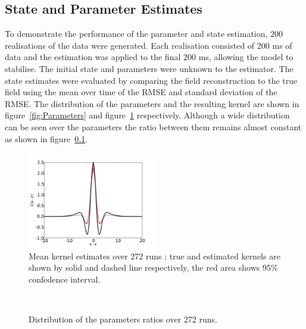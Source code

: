 \documentclass[12pt]{iopart}
\begin{document}
\subsection{State and Parameter Estimates} To demonstrate the performance of the parameter and state estimation, $200$ realisations of the data were generated. Each realisation consisted of 200 ms of data and the estimation was applied to the final 200 ms, allowing the model to stabilise. The initial state and parameters were unknown to the estimator. The state estimates were evaluated by comparing the field reconstruction to the true field using the mean over time of the RMSE and standard deviation of the RMSE. The distribution of the parameters and the resulting kernel are shown in figure~\ref{fig:Parameters} and figure~\ref{fig:KernelEstimates} respectively. Although a wide distribution can be seen over the parameters the ratio between them remains almost constant as shown in figure~\ref{}.
\begin{figure}
\includegraphics[width=0.5\textwidth]{./Graph/KernelEstimate.pdf}
\caption{Mean kernel estimates over 272 runs ;  true and estimated kernels are shown by solid
and dashed line respectively, the red area shows 95\% confedence interval.}
\label{fig:KernelEstimates}
\end{figure}
\begin{figure}[th]
\\
\caption{Distribution of the parameters ratios over 272 runs.}
\label{fig:ParametersRatio}
\end{figure}
\end{document}
